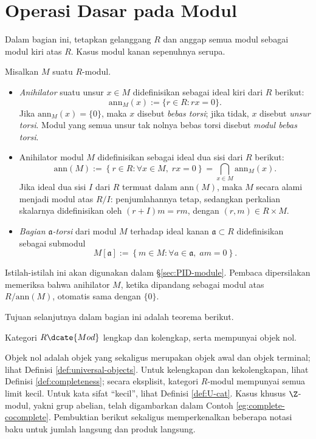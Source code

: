 \section{Operasi Dasar pada Modul}\label{sec:mod-operations}
Dalam bagian ini, tetapkan gelanggang $R$ dan anggap semua modul sebagai modul kiri atas $R$. Kasus modul kanan sepenuhnya serupa.

\begin{definition}\label{def:tor-ann}
	Misalkan $M$ suatu $R$-modul.
	\begin{itemize}
		\item \emph{Anihilator} suatu unsur $x \in M$ didefinisikan sebagai ideal kiri dari $R$ berikut:
		\[ \text{ann}_M(x) := \{r \in R : rx=0 \}. \]
		Jika $\text{ann}_M(x)=\{0\}$, maka $x$ disebut \emph{bebas torsi}; jika tidak, $x$ disebut \emph{unsur torsi}. Modul yang semua unsur tak nolnya bebas torsi disebut \emph{modul bebas torsi}. 
		\item Anihilator modul $M$ didefinisikan sebagai ideal dua sisi dari $R$ berikut:
		\[ \text{ann}(M) := \left\{r \in R: \forall x \in M, \; rx=0 \right\} = \bigcap_{x \in M} \text{ann}_M(x). \]
		Jika ideal dua sisi $I$ dari $R$ termuat dalam $\text{ann}(M)$, maka $M$ secara alami menjadi modul atas $R/I$: penjumlahannya tetap, sedangkan perkalian skalarnya didefinisikan oleh $(r + I)m = rm$, dengan $(r,m) \in R \times M$.
		\item \emph{Bagian $\mathfrak{a}$-torsi} dari modul $M$ terhadap ideal kanan $\mathfrak{a} \subset R$ didefinisikan sebagai submodul 
		\[ M[\mathfrak{a}] := \left\{ m \in M: \forall a \in \mathfrak{a}, \; am=0 \right\}. \]
	\end{itemize}
\end{definition}
Istilah-istilah ini akan digunakan dalam \S\ref{sec:PID-module}. Pembaca dipersilakan memeriksa bahwa anihilator $M$, ketika dipandang sebagai modul atas $R/\mathrm{ann}(M)$, otomatis sama dengan $\{0\}$.

Tujuan selanjutnya dalam bagian ini adalah teorema berikut. 
\begin{theorem}\label{prop:module-cat-completeness}
	Kategori $R\dcate{Mod}$ lengkap dan kolengkap, serta mempunyai objek nol.
\end{theorem}

Objek nol adalah objek yang sekaligus merupakan objek awal dan objek terminal; lihat Definisi \ref{def:universal-objects}. Untuk kelengkapan dan kekolengkapan, lihat Definisi \ref{def:completeness}; secara eksplisit, kategori $R$-modul mempunyai semua limit kecil. Untuk kata sifat ``kecil'', lihat Definisi \ref{def:U-cat}. Kasus khusus $\Z$-modul, yakni grup abelian, telah digambarkan dalam Contoh \ref{eg:complete-cocomplete}. Pembuktian berikut sekaligus memperkenalkan beberapa notasi baku untuk jumlah langsung dan produk langsung.

